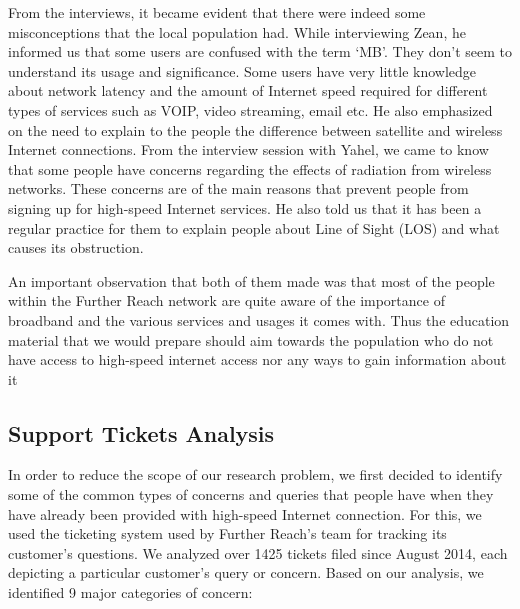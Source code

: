 From the interviews, it became evident that there were indeed some misconceptions that the local population had. While interviewing Zean, he informed us that some users are confused with the term `MB'. They don't seem to understand its usage and significance. Some users have very little knowledge about network latency and the amount of Internet speed required for different types of services such as VOIP, video streaming, email etc. He also emphasized on the need to explain to the people the difference between satellite and wireless Internet connections. From the interview session with Yahel, we came to know that some people have concerns regarding the effects of radiation from wireless networks. These concerns are of the main reasons that prevent people from signing up for high-speed Internet services. He also told us that it has been a regular practice for them to explain people about Line of Sight (LOS) and what causes its obstruction.

An important observation that both of them made was that most of the people within the Further Reach network are quite aware of the importance of broadband and the various services and usages it comes with. Thus the education material that we would prepare should aim towards the population who do not have access to high-speed internet access nor any ways to gain information about it

\subsection{Support Tickets Analysis}
\label{sec:supp-tick-analys}

In order to reduce the scope of our research problem, we first decided to identify some of the common types of concerns and queries that people have when they have already been provided with high-speed Internet connection. For this, we used the ticketing system used by Further Reach’s team for tracking its customer’s questions. We analyzed over 1425 tickets filed since August 2014, each depicting a particular customer’s query or concern. Based on our analysis, we identified 9 major categories of concern:


